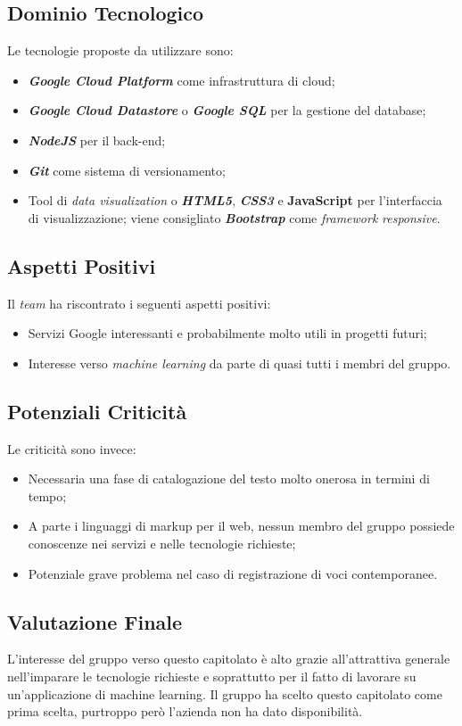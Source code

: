 \subsection{Dominio Tecnologico}
Le tecnologie proposte da utilizzare sono:
\begin{itemize}
	\item \textit{\textbf{Google Cloud Platform}} come infrastruttura di cloud;
	\item \textbf{\textit{Google Cloud Datastore}} o \textbf{\textit{Google SQL}} per la gestione del database;
	\item \textbf{\textit{NodeJS}} per il back-end;
	\item \textbf{\textit{Git}} come sistema di versionamento;
	\item Tool di \textit{data visualization} o \textbf{\textit{HTML5}}, \textbf{\textit{CSS3}} e \textbf{JavaScript} per l'interfaccia di visualizzazione; viene consigliato \textbf{\textit{Bootstrap}} come \textit{framework} \textit{responsive}.
\end{itemize}

\subsection{Aspetti Positivi}
Il \textit{team} ha riscontrato i seguenti aspetti positivi:
\begin{itemize}
	\item Servizi Google interessanti e probabilmente molto utili in progetti futuri;
	\item Interesse verso \textit{machine learning} da parte di quasi tutti i membri del gruppo.
\end{itemize}

\subsection{Potenziali Criticità}
Le criticità sono invece:
\begin{itemize}
	\item Necessaria una fase di catalogazione del testo molto onerosa in termini di tempo;
	\item A parte i linguaggi di markup per il web, nessun membro del gruppo possiede conoscenze nei servizi e nelle tecnologie richieste;
	\item Potenziale grave problema nel caso di registrazione di voci contemporanee.
\end{itemize}

\subsection{Valutazione Finale}
L'interesse del gruppo verso questo capitolato è alto grazie all'attrattiva generale nell'imparare le tecnologie richieste e soprattutto per il fatto di lavorare su un'applicazione di machine learning.
Il gruppo ha scelto questo capitolato come prima scelta, purtroppo però l'azienda non ha dato disponibilità.